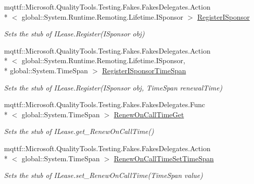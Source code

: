 \begin{DoxyCompactItemize}
mqttf\-::\-Microsoft.\-Quality\-Tools.\-Testing.\-Fakes.\-Fakes\-Delegates.\-Action\\*
$<$ global\-::\-System.\-Runtime.\-Remoting.\-Lifetime.\-I\-Sponsor $>$ \hyperlink{class_system_1_1_runtime_1_1_remoting_1_1_lifetime_1_1_fakes_1_1_stub_i_lease_a7530589491be1ffbf44d8e19ab8fada5}{Register\-I\-Sponsor}
\begin{DoxyCompactList}\small\item\em Sets the stub of I\-Lease.\-Register(\-I\-Sponsor obj)\end{DoxyCompactList}\item 
mqttf\-::\-Microsoft.\-Quality\-Tools.\-Testing.\-Fakes.\-Fakes\-Delegates.\-Action\\*
$<$ global\-::\-System.\-Runtime.\-Remoting.\-Lifetime.\-I\-Sponsor, \\*
global\-::\-System.\-Time\-Span $>$ \hyperlink{class_system_1_1_runtime_1_1_remoting_1_1_lifetime_1_1_fakes_1_1_stub_i_lease_a0a5841ad06322d231fbcbfae38bc6556}{Register\-I\-Sponsor\-Time\-Span}
\begin{DoxyCompactList}\small\item\em Sets the stub of I\-Lease.\-Register(\-I\-Sponsor obj, Time\-Span renewal\-Time)\end{DoxyCompactList}\item 
mqttf\-::\-Microsoft.\-Quality\-Tools.\-Testing.\-Fakes.\-Fakes\-Delegates.\-Func\\*
$<$ global\-::\-System.\-Time\-Span $>$ \hyperlink{class_system_1_1_runtime_1_1_remoting_1_1_lifetime_1_1_fakes_1_1_stub_i_lease_abfd85f79386ce5dbb4f80b4ea618370e}{Renew\-On\-Call\-Time\-Get}
\begin{DoxyCompactList}\small\item\em Sets the stub of I\-Lease.\-get\-\_\-\-Renew\-On\-Call\-Time()\end{DoxyCompactList}\item 
mqttf\-::\-Microsoft.\-Quality\-Tools.\-Testing.\-Fakes.\-Fakes\-Delegates.\-Action\\*
$<$ global\-::\-System.\-Time\-Span $>$ \hyperlink{class_system_1_1_runtime_1_1_remoting_1_1_lifetime_1_1_fakes_1_1_stub_i_lease_a1d0c27cf632f55bf5f58710aa3e917c2}{Renew\-On\-Call\-Time\-Set\-Time\-Span}
\begin{DoxyCompactList}\small\item\em Sets the stub of I\-Lease.\-set\-\_\-\-Renew\-On\-Call\-Time(\-Time\-Span value)\end{DoxyCompactList}\item 

\end{DoxyCompactItemize}
